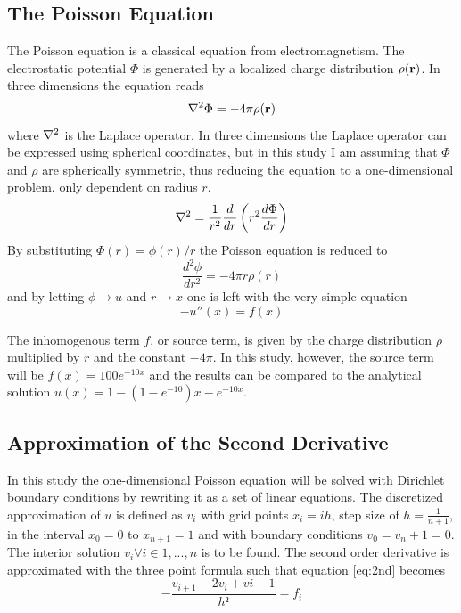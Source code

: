 \documentclass[10pt, a4paper]{amsart}
\begin{document}
\subsection{The Poisson Equation}
The Poisson equation is a classical equation from electromagnetism. The electrostatic potential $\Phi$ is generated by a localized charge distribution $\rho(\vb{r})$. In three dimensions the equation reads
\begin{equation}
\laplacian\Phi=-4\pi \rho(\vb{r})
\end{equation}
where $\laplacian$ is the Laplace operator. In three dimensions the Laplace operator can be expressed using spherical coordinates, but in this study I am assuming that $\Phi$ and $\rho$ are spherically symmetric, thus reducing the equation to a one-dimensional problem. only dependent on radius $r$.
\begin{equation}
\laplacian=\frac{1}{r^2}\frac{d}{dr}\left(r^2\frac{d\Phi}{dr} \right)
\end{equation}
By substituting $\Phi(r)=\phi(r)/r$ the Poisson equation is reduced to 
\begin{equation}
\frac{d^2\phi}{dr^2}=-4\pi r\rho(r)
\end{equation}
and by letting $\phi \rightarrow u$ and $r \rightarrow x$ one is left with the very simple equation
\begin{equation}
-u''(x)=f(x) \label{eq:2nd}
\end{equation}

The inhomogenous term $f$, or source term, is given by the charge distribution $\rho$ multiplied by $r$ and the constant $-4\pi$. In this study, however, the source term will be $f(x)=100e^{-10x}$ and the results can be compared to the analytical solution $u(x)=1-(1-e^{-10})x-e^{-10x}$. 


\subsection{Approximation of the Second Derivative}
In this study the one-dimensional Poisson equation will be solved with Dirichlet boundary conditions by rewriting it as a set of linear equations. The discretized approximation of $u$ is defined as $v_i$ with grid points $x_i=ih$, step size of $h=\frac{1}{n+1}$, in the interval $x_0=0$ to $x_{n+1}=1$ and with boundary conditions $v_0=v_n+1=0$. The interior solution $v_i \forall i \in {1,...,n}$ is to be found. The second order derivative is approximated with the three point formula such that equation \ref{eq:2nd} becomes
\begin{equation}
-\frac{v_{i+1}-2v_i+v{i-1}}{h²}=f_i \label{eq:2approx}
\end{equation}
\end{document}
